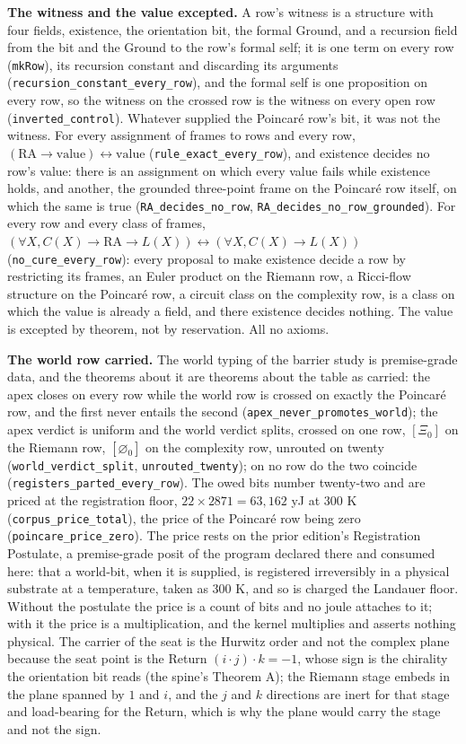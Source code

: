 \documentclass[10pt,twocolumn]{article}
\begin{document}
\textbf{The witness and the value excepted.} A row's witness is a
structure with four fields, existence, the orientation bit, the formal
Ground, and a recursion field from the bit and the Ground to the row's
formal self; it is one term on every row (\texttt{mkRow}), its recursion
constant and discarding its arguments
(\texttt{recursion\_constant\_every\_row}), and the formal self is one
proposition on every row, so the witness on the crossed row is the
witness on every open row (\texttt{inverted\_control}). Whatever
supplied the Poincaré row's bit, it was not the witness. For every
assignment of frames to rows and every row,
\((\mathrm{RA} \to \mathrm{value}) \leftrightarrow \mathrm{value}\)
(\texttt{rule\_exact\_every\_row}), and existence decides no row's
value: there is an assignment on which every value fails while existence
holds, and another, the grounded three-point frame on the Poincaré row
itself, on which the same is true (\texttt{RA\_decides\_no\_row},
\texttt{RA\_decides\_no\_row\_grounded}). For every row and every class
of frames,
\((\forall X, C(X) \to \mathrm{RA} \to L(X)) \leftrightarrow (\forall X, C(X) \to L(X))\)
(\texttt{no\_cure\_every\_row}): every proposal to make existence decide
a row by restricting its frames, an Euler product on the Riemann row, a
Ricci-flow structure on the Poincaré row, a circuit class on the
complexity row, is a class on which the value is already a field, and
there existence decides nothing. The value is excepted by theorem, not
by reservation. All no axioms.

\textbf{The world row carried.} The world typing of the barrier study is
premise-grade data, and the theorems about it are theorems about the
table as carried: the apex closes on every row while the world row is
crossed on exactly the Poincaré row, and the first never entails the
second (\texttt{apex\_never\_promotes\_world}); the apex verdict is
uniform and the world verdict splits, crossed on one row, \([\Xi_0]\) on
the Riemann row, \([\varnothing_0]\) on the complexity row, unrouted on
twenty (\texttt{world\_verdict\_split}, \texttt{unrouted\_twenty}); on
no row do the two coincide (\texttt{registers\_parted\_every\_row}). The
owed bits number twenty-two and are priced at the registration floor,
\(22 \times 2871 = 63{,}162\) yJ at \(300\) K
(\texttt{corpus\_price\_total}), the price of the Poincaré row being
zero (\texttt{poincare\_price\_zero}). The price rests on the prior
edition's Registration Postulate, a premise-grade posit of the program
declared there and consumed here: that a world-bit, when it is supplied,
is registered irreversibly in a physical substrate at a temperature,
taken as \(300\) K, and so is charged the Landauer floor. Without the
postulate the price is a count of bits and no joule attaches to it; with
it the price is a multiplication, and the kernel multiplies and asserts
nothing physical. The carrier of the seat is the Hurwitz order and not
the complex plane because the seat point is the Return
\((i \cdot j) \cdot k = -1\), whose sign is the chirality the
orientation bit reads (the spine's Theorem A); the Riemann stage embeds
in the plane spanned by \(1\) and \(i\), and the \(j\) and \(k\)
directions are inert for that stage and load-bearing for the Return,
which is why the plane would carry the stage and not the sign.
\end{document}
